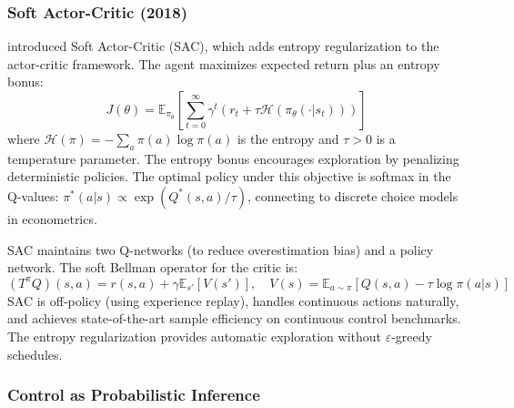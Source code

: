 \subsubsection{Soft Actor-Critic (2018)}

\citet{Haarnoja2018} introduced Soft Actor-Critic (SAC), which adds entropy regularization to the actor-critic framework. The agent maximizes expected return plus an entropy bonus:
\begin{equation}
J(\theta) = \mathbb{E}_{\pi_\theta}\left[\sum_{t=0}^\infty \gamma^t \left(r_t + \tau \mathcal{H}(\pi_\theta(\cdot|s_t))\right)\right]
\end{equation}
where $\mathcal{H}(\pi) = -\sum_a \pi(a) \log \pi(a)$ is the entropy and $\tau > 0$ is a temperature parameter. The entropy bonus encourages exploration by penalizing deterministic policies. The optimal policy under this objective is softmax in the Q-values: $\pi^*(a|s) \propto \exp(Q^*(s,a)/\tau)$, connecting to discrete choice models in econometrics.

SAC maintains two Q-networks (to reduce overestimation bias) and a policy network. The soft Bellman operator for the critic is:
\begin{equation}
(T^\pi Q)(s,a) = r(s,a) + \gamma \mathbb{E}_{s'}\left[ V(s') \right], \quad V(s) = \mathbb{E}_{a \sim \pi}[Q(s,a) - \tau \log \pi(a|s)]
\end{equation}
SAC is off-policy (using experience replay), handles continuous actions naturally, and achieves state-of-the-art sample efficiency on continuous control benchmarks. The entropy regularization provides automatic exploration without $\varepsilon$-greedy schedules.

\FloatBarrier
\subsubsection{Control as Probabilistic Inference}
\label{sec:control_inference}


